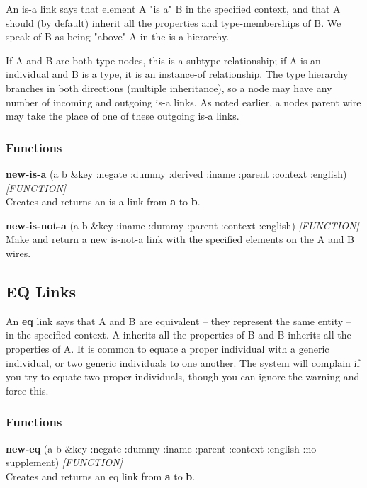 \documentclass[titlepage,twoside,openright,11pt]{article}
\begin{document}
An is-a link says that element A "is a" B in the specified context, and
that A should (by default) inherit all the properties and
type-memberships of B. We speak of B as being "above" A in the is-a
hierarchy.

If A and B are both type-nodes, this is a subtype relationship; if A is
an individual and B is a type, it is an instance-of relationship. The
type hierarchy branches in both directions (multiple inheritance), so a
node may have any number of incoming and outgoing is-a links. As noted
earlier, a node\textquotesingle s parent wire may take the place of one
of these outgoing is-a links.

\subsubsection{Functions}\label{functions-4}

\textbf{new-is-a} (a b \&key :negate :dummy :derived :iname :parent
:context :english) \emph{{[}FUNCTION{]}}\\
Creates and returns an is-a link from \textbf{a} to \textbf{b}.

\textbf{new-is-not-a} (a b \&key :iname :dummy :parent :context
:english) \emph{{[}FUNCTION{]}}\\
Make and return a new is-not-a link with the specified elements on the A
and B wires.

\subsection{EQ Links}\label{eq-links}

An \textbf{eq} link says that A and B are equivalent -- they represent
the same entity -- in the specified context. A inherits all the
properties of B and B inherits all the properties of A. It is common to
equate a proper individual with a generic individual, or two generic
individuals to one another. The system will complain if you try to
equate two proper individuals, though you can ignore the warning and
force this.

\subsubsection{Functions}\label{functions-5}

\textbf{new-eq} (a b \&key :negate :dummy :iname :parent :context
:english :no-supplement) \emph{{[}FUNCTION{]}}\\
Creates and returns an eq link from \textbf{a} to \textbf{b}.
\end{document}

